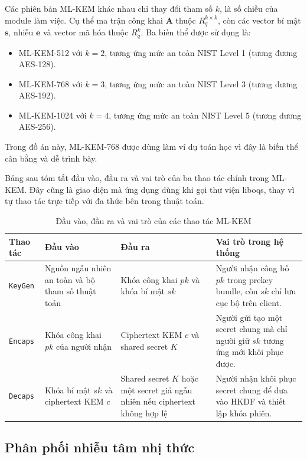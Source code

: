 Các phiên bản ML-KEM khác nhau chỉ thay đổi tham số $k$, là số chiều của module làm việc. Cụ thể ma trận công khai $\mathbf{A}$ thuộc $R_q^{k \times k}$, còn các vector bí mật $\mathbf{s}$, nhiễu $\mathbf{e}$ và vector mã hóa thuộc $R_q^k$. Ba biến thể được sử dụng là:
\begin{itemize}
    \item ML-KEM-512 với $k = 2$, tương ứng mức an toàn NIST Level 1 (tương đương AES-128).
    \item ML-KEM-768 với $k = 3$, tương ứng mức an toàn NIST Level 3 (tương đương AES-192).
    \item ML-KEM-1024 với $k = 4$, tương ứng mức an toàn NIST Level 5 (tương đương AES-256).
\end{itemize}
Trong đồ án này, ML-KEM-768 được dùng làm ví dụ toán học vì đây là biến thể cân bằng và dễ trình bày. 

Bảng sau tóm tắt đầu vào, đầu ra và vai trò của ba thao tác chính trong ML-KEM. Đây cũng là giao diện mà ứng dụng dùng khi gọi thư viện liboqs, thay vì tự thao tác trực tiếp với đa thức bên trong thuật toán.

\begin{table}[H]
\centering
\renewcommand{\arraystretch}{1.25}
\begin{tabularx}{\linewidth}{|p{3cm}|p{3.8cm}|p{3.8cm}|X|}
\hline
\textbf{Thao tác} & \textbf{Đầu vào} & \textbf{Đầu ra} & \textbf{Vai trò trong hệ thống} \\
\hline
\texttt{KeyGen} & Nguồn ngẫu nhiên an toàn và bộ tham số thuật toán & Khóa công khai $pk$ và khóa bí mật $sk$ & Người nhận công bố $pk$ trong prekey bundle, còn $sk$ chỉ lưu cục bộ trên client. \\
\hline
\texttt{Encaps} & Khóa công khai $pk$ của người nhận & Ciphertext KEM $c$ và shared secret $K$ & Người gửi tạo một secret chung mà chỉ người giữ $sk$ tương ứng mới khôi phục được. \\
\hline
\texttt{Decaps} & Khóa bí mật $sk$ và ciphertext KEM $c$ & Shared secret $K$ hoặc một secret giả ngẫu nhiên nếu ciphertext không hợp lệ & Người nhận khôi phục secret chung để đưa vào HKDF và thiết lập khóa phiên. \\
\hline
\end{tabularx}
\caption{Đầu vào, đầu ra và vai trò của các thao tác ML-KEM}
\end{table}

\subsection{Phân phối nhiễu tâm nhị thức}

